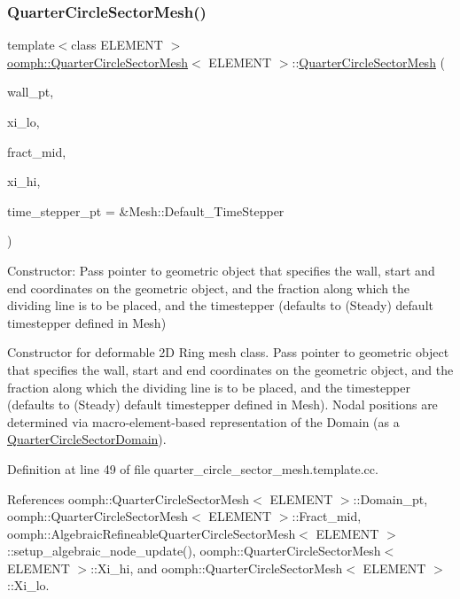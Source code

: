 \subsubsection{\texorpdfstring{Quarter\+Circle\+Sector\+Mesh()}{QuarterCircleSectorMesh()}}
{\footnotesize\ttfamily template$<$class E\+L\+E\+M\+E\+NT $>$ \\
\hyperlink{classoomph_1_1QuarterCircleSectorMesh}{oomph\+::\+Quarter\+Circle\+Sector\+Mesh}$<$ E\+L\+E\+M\+E\+NT $>$\+::\hyperlink{classoomph_1_1QuarterCircleSectorMesh}{Quarter\+Circle\+Sector\+Mesh} (\begin{DoxyParamCaption}\item[{Geom\+Object $\ast$}]{wall\+\_\+pt,  }\item[{const double \&}]{xi\+\_\+lo,  }\item[{const double \&}]{fract\+\_\+mid,  }\item[{const double \&}]{xi\+\_\+hi,  }\item[{Time\+Stepper $\ast$}]{time\+\_\+stepper\+\_\+pt = {\ttfamily \&Mesh\+:\+:Default\+\_\+TimeStepper} }\end{DoxyParamCaption})}



Constructor\+: Pass pointer to geometric object that specifies the wall, start and end coordinates on the geometric object, and the fraction along which the dividing line is to be placed, and the timestepper (defaults to (Steady) default timestepper defined in Mesh) 

Constructor for deformable 2D Ring mesh class. Pass pointer to geometric object that specifies the wall, start and end coordinates on the geometric object, and the fraction along which the dividing line is to be placed, and the timestepper (defaults to (Steady) default timestepper defined in Mesh). Nodal positions are determined via macro-\/element-\/based representation of the Domain (as a \hyperlink{classoomph_1_1QuarterCircleSectorDomain}{Quarter\+Circle\+Sector\+Domain}). 

Definition at line 49 of file quarter\+\_\+circle\+\_\+sector\+\_\+mesh.\+template.\+cc.



References oomph\+::\+Quarter\+Circle\+Sector\+Mesh$<$ E\+L\+E\+M\+E\+N\+T $>$\+::\+Domain\+\_\+pt, oomph\+::\+Quarter\+Circle\+Sector\+Mesh$<$ E\+L\+E\+M\+E\+N\+T $>$\+::\+Fract\+\_\+mid, oomph\+::\+Algebraic\+Refineable\+Quarter\+Circle\+Sector\+Mesh$<$ E\+L\+E\+M\+E\+N\+T $>$\+::setup\+\_\+algebraic\+\_\+node\+\_\+update(), oomph\+::\+Quarter\+Circle\+Sector\+Mesh$<$ E\+L\+E\+M\+E\+N\+T $>$\+::\+Xi\+\_\+hi, and oomph\+::\+Quarter\+Circle\+Sector\+Mesh$<$ E\+L\+E\+M\+E\+N\+T $>$\+::\+Xi\+\_\+lo.

